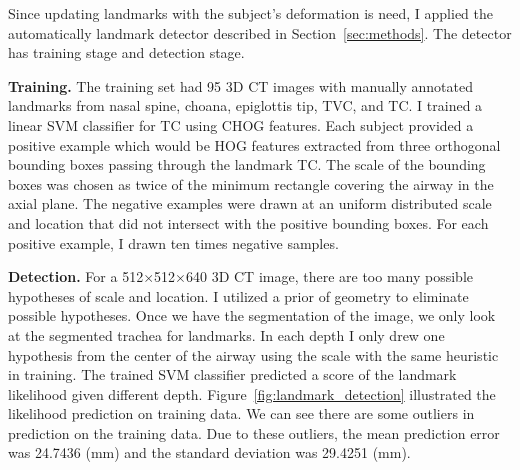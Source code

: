 Since updating landmarks with the subject's deformation is need, I applied the automatically landmark detector described in Section~\ref{sec:methods}.
The detector has training stage and detection stage.

{\bf Training.} 
The training set had 95 3D CT images with manually annotated landmarks from nasal spine, choana, epiglottis tip, TVC, and TC.
I trained a linear SVM classifier for TC using CHOG features.
Each subject provided a positive example which would be HOG features extracted from three orthogonal bounding boxes passing through the landmark TC.
The scale of the bounding boxes was chosen as twice of the minimum rectangle covering the airway in the axial plane.
The negative examples were drawn at an uniform distributed scale and location that did not intersect with the positive bounding boxes.
For each positive example, I drawn ten times negative samples.

{\bf Detection.}
For a 512$\times$512$\times$640 3D CT image, there are too many possible hypotheses of scale and location.
I utilized a prior of geometry to eliminate possible hypotheses.
Once we have the segmentation of the image, we only look at the segmented trachea for landmarks.
In each depth I only drew one hypothesis from the center of the airway using the scale with the same heuristic in training.
The trained SVM classifier predicted a score of the landmark likelihood given different depth.
Figure~\ref{fig:landmark_detection} illustrated the likelihood prediction on training data.
We can see there are some outliers in prediction on the training data.
Due to these outliers, the mean prediction error was 24.7436 (mm) and the standard deviation was 29.4251 (mm).

